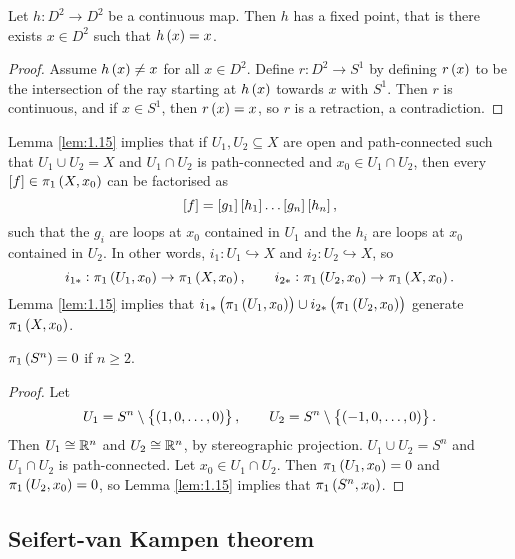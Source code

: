 \begin{theorem}
Let $ h : D^2 \to D^2 $ be a continuous map. Then $ h $ has a fixed point, that is there exists $ x \in D^2 $ such that $ h\br{x} = x $.
\end{theorem}

\begin{proof}
Assume $ h\br{x} \ne x $ for all $ x \in D^2 $. Define $ r : D^2 \to S^1 $ by defining $ r\br{x} $ to be the intersection of the ray starting at $ h\br{x} $ towards $ x $ with $ S^1 $. Then $ r $ is continuous, and if $ x \in S^1 $, then $ r\br{x} = x $, so $ r $ is a retraction, a contradiction.
\end{proof}

Lemma \ref{lem:1.15} implies that if $ U_1, U_2 \subseteq X $ are open and path-connected such that $ U_1 \cup U_2 = X $ and $ U_1 \cap U_2 $ is path-connected and $ x_0 \in U_1 \cap U_2 $, then every $ \sbr{f} \in \pi_1\br{X, x_0} $ can be factorised as
$$ \sbr{f} = \sbr{g_1}\sbr{h_1} \dots \sbr{g_n}\sbr{h_n}, $$
such that the $ g_i $ are loops at $ x_0 $ contained in $ U_1 $ and the $ h_i $ are loops at $ x_0 $ contained in $ U_2 $. In other words, $ i_1 : U_1 \hookrightarrow X $ and $ i_2 : U_2 \hookrightarrow X $, so
$$ i_{1*} : \pi_1\br{U_1, x_0} \to \pi_1\br{X, x_0}, \qquad i_{2*} : \pi_1\br{U_2, x_0} \to \pi_1\br{X, x_0}. $$
Lemma \ref{lem:1.15} implies that $ i_{1*}\br{\pi_1\br{U_1, x_0}} \cup i_{2*}\br{\pi_1\br{U_2, x_0}} $ generate $ \pi_1\br{X, x_0} $.

\begin{proposition}
$ \pi_1\br{S^n} = 0 $ if $ n \ge 2 $.
\end{proposition}

\begin{proof}
Let
$$ U_1 = S^n \setminus \cbr{\br{1, 0, \dots, 0}}, \qquad U_2 = S^n \setminus \cbr{\br{-1, 0, \dots, 0}}. $$
Then $ U_1 \cong \mathbb{R}^n $ and $ U_2 \cong \mathbb{R}^n $, by stereographic projection. $ U_1 \cup U_2 = S^n $ and $ U_1 \cap U_2 $ is path-connected. Let $ x_0 \in U_1 \cap U_2 $. Then $ \pi_1\br{U_1, x_0} = 0 $ and $ \pi_1\br{U_2, x_0} = 0 $, so Lemma \ref{lem:1.15} implies that $ \pi_1\br{S^n, x_0} $.
\end{proof}

\pagebreak

\subsection{Seifert-van Kampen theorem}

